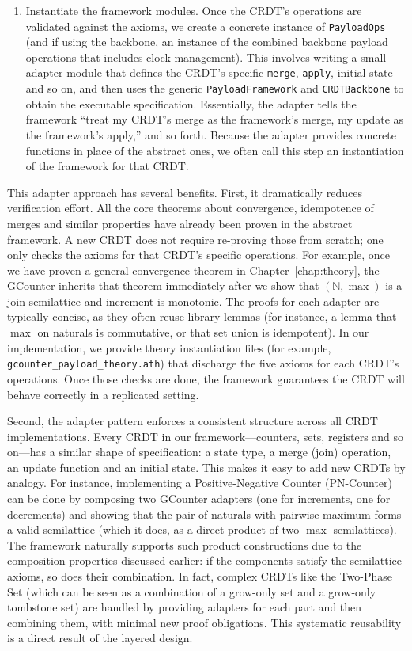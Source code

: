 \begin{enumerate}
  \item Instantiate the framework modules. Once the CRDT’s operations are validated against the axioms, we create a concrete instance of \texttt{PayloadOps} (and if using the backbone, an instance of the combined backbone payload operations that includes clock management). This involves writing a small adapter module that defines the CRDT’s specific \texttt{merge}, \texttt{apply}, initial state and so on, and then uses the generic \texttt{PayloadFramework} and \texttt{CRDTBackbone} to obtain the executable specification. Essentially, the adapter tells the framework “treat my CRDT’s merge as the framework’s merge, my update as the framework’s apply,” and so forth. Because the adapter provides concrete functions in place of the abstract ones, we often call this step an instantiation of the framework for that CRDT.
\end{enumerate}

This adapter approach has several benefits. First, it dramatically reduces verification effort. All the core theorems about convergence, idempotence of merges and similar properties have already been proven in the abstract framework. A new CRDT does not require re-proving those from scratch; one only checks the axioms for that CRDT’s specific operations. For example, once we have proven a general convergence theorem in Chapter~\ref{chap:theory}, the GCounter inherits that theorem immediately after we show that $(\mathbb{N}, \max)$ is a join-semilattice and increment is monotonic. The proofs for each adapter are typically concise, as they often reuse library lemmas (for instance, a lemma that $\max$ on naturals is commutative, or that set union is idempotent). In our implementation, we provide theory instantiation files (for example, \texttt{gcounter\_payload\_theory.ath}) that discharge the five axioms for each CRDT’s operations. Once those checks are done, the framework guarantees the CRDT will behave correctly in a replicated setting.

Second, the adapter pattern enforces a consistent structure across all CRDT implementations. Every CRDT in our framework—counters, sets, registers and so on—has a similar shape of specification: a state type, a merge (join) operation, an update function and an initial state. This makes it easy to add new CRDTs by analogy. For instance, implementing a Positive-Negative Counter (PN-Counter) can be done by composing two GCounter adapters (one for increments, one for decrements) and showing that the pair of naturals with pairwise maximum forms a valid semilattice (which it does, as a direct product of two $\max$-semilattices). The framework naturally supports such product constructions due to the composition properties discussed earlier: if the components satisfy the semilattice axioms, so does their combination. In fact, complex CRDTs like the Two-Phase Set (which can be seen as a combination of a grow-only set and a grow-only tombstone set) are handled by providing adapters for each part and then combining them, with minimal new proof obligations. This systematic reusability is a direct result of the layered design.

